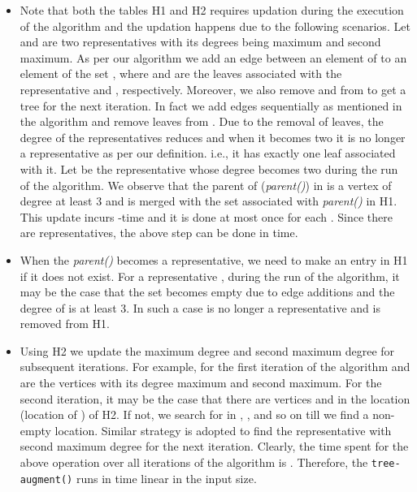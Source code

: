 \documentclass[runningheads]{llncs}
\begin{document}
\begin{itemize}
\item Note that both the tables H1 and H2 requires updation during the execution of the algorithm and the updation happens due to the following scenarios.  Let  and  are two representatives with its degrees being maximum and second maximum.  As per our algorithm we add an edge between an element of  to an element of the set , where  and  are the leaves associated with the representative  and , respectively.  Moreover, we also remove  and  from  to get a tree for the next iteration.  In fact we add  edges sequentially as mentioned in the algorithm and remove  leaves from .  Due to the removal of leaves, the degree of the representatives reduces and when it becomes two it is no longer a representative as per our definition.  i.e., it has exactly one leaf associated with it.  Let  be the representative whose degree becomes two during the run of the algorithm.  We observe that the parent of  ({\em parent()}) in  is a vertex of degree at least 3 and  is merged with the set associated with {\em parent()} in H1.  This update incurs -time and it is done at most once for each .  Since there are  representatives, the above step can be done in  time.
\item When the {\em parent()} becomes a representative, we need to make an entry in H1 if it does not exist.  For a representative , during the run of the algorithm, it may be the case that the set  becomes empty due to edge additions and the degree of  is at least 3.  In such a case  is no longer a representative and is removed from H1.  
\item Using H2 we update the maximum degree and second maximum degree for subsequent iterations.  For example, for the first iteration of the algorithm  and  are the vertices with its degree maximum and second maximum.  For the second iteration, it may be the case that there are vertices  and  in the location  (location of ) of H2.  If not, we search for  in , , and so on till we find a non-empty location.  Similar strategy is adopted to find the representative with second maximum degree for the next iteration.  Clearly, the time spent for the above operation over all iterations of the algorithm  is .  Therefore, the {\tt tree-augment()} runs in time linear in the input size.
\end{itemize}
\end{document}
